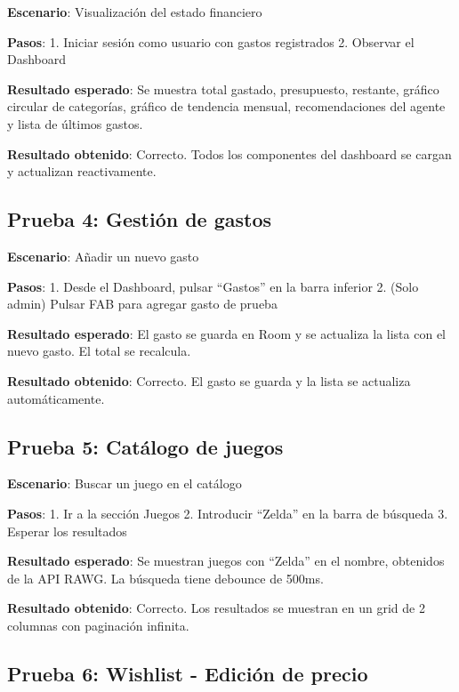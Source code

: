\documentclass[
  spanish,
  11pt,
  paper=a4,
  ,captions=tableheading
]{scrartcl}
\begin{document}
\textbf{Escenario}: Visualización del estado financiero

\textbf{Pasos}: 1. Iniciar sesión como usuario con gastos registrados 2.
Observar el Dashboard

\textbf{Resultado esperado}: Se muestra total gastado, presupuesto,
restante, gráfico circular de categorías, gráfico de tendencia mensual,
recomendaciones del agente y lista de últimos gastos.

\textbf{Resultado obtenido}: Correcto. Todos los componentes del
dashboard se cargan y actualizan reactivamente.

\hypertarget{prueba-4-gestiuxf3n-de-gastos}{%
\subsection{Prueba 4: Gestión de
gastos}\label{prueba-4-gestiuxf3n-de-gastos}}

\textbf{Escenario}: Añadir un nuevo gasto

\textbf{Pasos}: 1. Desde el Dashboard, pulsar ``Gastos'' en la barra
inferior 2. (Solo admin) Pulsar FAB para agregar gasto de prueba

\textbf{Resultado esperado}: El gasto se guarda en Room y se actualiza
la lista con el nuevo gasto. El total se recalcula.

\textbf{Resultado obtenido}: Correcto. El gasto se guarda y la lista se
actualiza automáticamente.

\hypertarget{prueba-5-catuxe1logo-de-juegos}{%
\subsection{Prueba 5: Catálogo de
juegos}\label{prueba-5-catuxe1logo-de-juegos}}

\textbf{Escenario}: Buscar un juego en el catálogo

\textbf{Pasos}: 1. Ir a la sección Juegos 2. Introducir ``Zelda'' en la
barra de búsqueda 3. Esperar los resultados

\textbf{Resultado esperado}: Se muestran juegos con ``Zelda'' en el
nombre, obtenidos de la API RAWG. La búsqueda tiene debounce de 500ms.

\textbf{Resultado obtenido}: Correcto. Los resultados se muestran en un
grid de 2 columnas con paginación infinita.

\hypertarget{prueba-6-wishlist---ediciuxf3n-de-precio}{%
\subsection{Prueba 6: Wishlist - Edición de
precio}\label{prueba-6-wishlist---ediciuxf3n-de-precio}}
\end{document}
